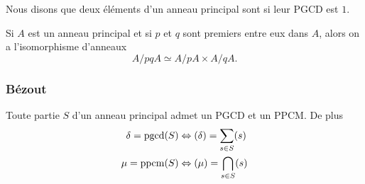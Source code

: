 \begin{definition}      \label{DEFooXSPFooPumQSy}
Nous disons que deux éléments d'un anneau principal sont  si leur PGCD est \( 1\).
\end{definition}

\begin{theorem}        \label{ThofPXwiM}
    Si \( A\) est un anneau principal et si \( p\) et \( q\) sont premiers entre eux dans \( A\), alors on a l'isomorphisme d'anneaux
    \begin{equation}
        A/pqA\simeq A/pA\times A/qA.
    \end{equation}
\end{theorem}

\subsubsection{Bézout}
\begin{theorem}
    Toute partie \( S\) d'un anneau principal admet un PGCD et un PPCM. De plus
    \begin{equation}
        \begin{aligned}[]
            \delta=\pgcd(S)&\Leftrightarrow (\delta)=\sum_{s\in S}(s)\\
            \mu=\ppcm(S)&\Leftrightarrow (\mu)=\bigcap_{s\in S}(s)
        \end{aligned}
    \end{equation}
\end{theorem}

